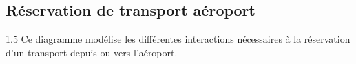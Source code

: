 \documentclass[a4paper,12pt]{report}
\newcommand{\actbar}[3]{\draw[hw] (#1-0.28,#2) rectangle (#1+0.28,#3);}
\newcommand{\seqA}[4]{\draw[seqmsg] (#1,#3) -- node[above,seqlbl]{#4} (#2,#3);}
\newcommand{\seqR}[4]{\draw[seqret] (#1,#3) -- node[above,seqlbl]{#4} (#2,#3);}
\newcommand{\seqF}[6]{%
  \draw[seqfrag] (#1,#2) rectangle (#3,#4);
  \node[font=\tiny\sffamily\bfseries,text=mainblue] at (#1+0.9,#2-0.18){#5};
  \node[font=\tiny\sffamily,text=mainblue!75,align=center]
        at ({(#1+#3)/2},#2-0.38){#6};}
\newcommand{\CPA}{0}
\newcommand{\CPB}{5.5}
\newcommand{\CPC}{12}
\newcommand{\CPD}{18.5}
\newcommand{\CPE}{25}
\begin{document}
\subsection{Réservation de transport aéroport}
\vspace{0.5cm}
\begin{spacing}{1.5}
\justifying
Ce diagramme modélise les différentes interactions nécessaires à la réservation d'un transport depuis ou vers l'aéroport.
    
    
    
    
    
    
    

\end{spacing}
\end{document}
